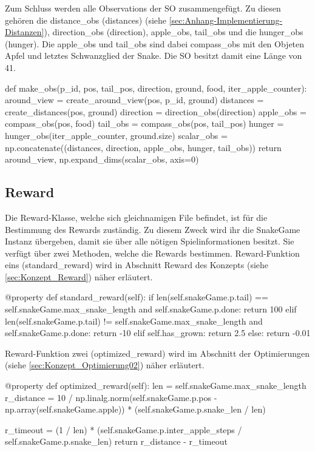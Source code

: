 Zum Schluss werden alle Observations der SO zusammengefügt. Zu diesen gehören die distance\_obs (distances) (siehe \ref{sec:Anhang-Implementierung-Distanzen}), direction\_obs (direction), apple\_obs, tail\_obs und die hunger\_obs (hunger). Die apple\_obs und tail\_obs sind dabei compass\_obs mit den Objeten Apfel und letztes Schwanzglied der Snake. Die SO besitzt damit eine Länge von 41.
\begin{python}
	def make_obs(p_id, pos, tail_pos, direction, ground, food, iter_apple_counter):
		around_view = create_around_view(pos, p_id, ground)
		distances = create_distances(pos, ground)
		direction = direction_obs(direction)
		apple_obs = compass_obs(pos, food)
		tail_obs = compass_obs(pos, tail_pos)
		hunger = hunger_obs(iter_apple_counter, ground.size)
		scalar_obs = np.concatenate((distances, direction, apple_obs, hunger, tail_obs))
		return around_view, np.expand_dims(scalar_obs, axis=0)
\end{python}


\subsection{Reward} \label{sec:Implementierung_Reward}
Die Reward-Klasse, welche sich gleichnamigen File befindet, ist für die Bestimmung des Rewards zuständig. Zu diesem Zweck wird ihr die SnakeGame Instanz übergeben, damit sie über alle nötigen Spielinformationen besitzt. Sie verfügt über zwei Methoden, welche die Rewards bestimmen. Reward-Funktion eins (standard\_reward) wird in Abschnitt Reward des Konzepts (siehe \ref{sec:Konzept_Reward}) näher erläutert.
\begin{python}
	@property
	def standard_reward(self):
		if len(self.snakeGame.p.tail) == self.snakeGame.max_snake_length and self.snakeGame.p.done:
			return 100
		elif len(self.snakeGame.p.tail) != self.snakeGame.max_snake_length and self.snakeGame.p.done:
			return -10
		elif self.has_grown:
			return 2.5
		else:
			return -0.01
\end{python}
Reward-Funktion zwei (optimized\_reward) wird im Abschnitt der Optimierungen (siehe \ref{sec:Konzept_Optimierung02}) näher erläutert.
\begin{python}
	@property
	def optimized_reward(self):
		len = self.snakeGame.max_snake_length
		r_distance = 10 / np.linalg.norm(self.snakeGame.p.pos - np.array(self.snakeGame.apple)) * (self.snakeGame.p.snake_len / len)
		
		r_timeout = (1 / len) * (self.snakeGame.p.inter_apple_steps / self.snakeGame.p.snake_len)
		return r_distance - r_timeout
\end{python}


